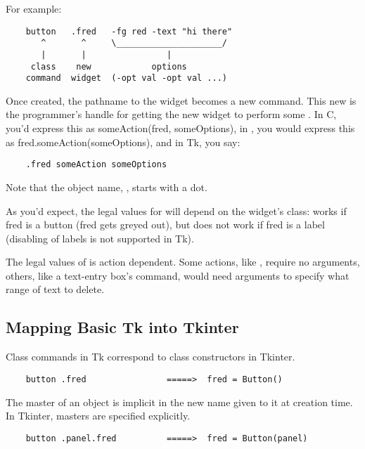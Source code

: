 For example: 

\begin{verbatim}
    button   .fred   -fg red -text "hi there"
       ^       ^     \_____________________/
       |       |                |
     class    new            options
    command  widget  (-opt val -opt val ...)
\end{verbatim} 

Once created, the pathname to the widget becomes a new command.  This
new  is the programmer's handle for getting the new
widget to perform some .  In C, you'd express this as
someAction(fred, someOptions), in \Cpp, you would express this as
fred.someAction(someOptions), and in Tk, you say: 

\begin{verbatim}
    .fred someAction someOptions 
\end{verbatim} 

Note that the object name, , starts with a dot.

As you'd expect, the legal values for  will depend on
the widget's class:  works if fred is a
button (fred gets greyed out), but does not work if fred is a label
(disabling of labels is not supported in Tk). 

The legal values of  is action dependent.  Some
actions, like , require no arguments, others, like
a text-entry box's  command, would need arguments
to specify what range of text to delete.  


\subsection{Mapping Basic Tk into Tkinter
            \label{tkinter-basic-mapping}}

Class commands in Tk correspond to class constructors in Tkinter.

\begin{verbatim}
    button .fred                =====>  fred = Button()
\end{verbatim}

The master of an object is implicit in the new name given to it at
creation time.  In Tkinter, masters are specified explicitly.

\begin{verbatim}
    button .panel.fred          =====>  fred = Button(panel)
\end{verbatim}

